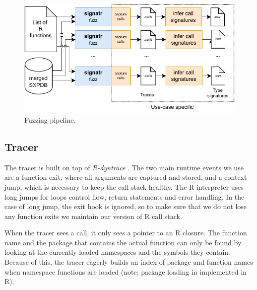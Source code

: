 \documentclass[sigplan,anonymous,review]{acmart}
\begin{document}
\begin{figure}
    \centering
    \includegraphics[width=\columnwidth]{code-and-figures/fuzz-pipeline.pdf}
    \caption{
    Fuzzing pipeline.
    }\label{fig:fuzz-pipeline}
\end{figure}

\subsection{Tracer}\label{sec:argtracer}

The tracer is built on top of \emph{R-dyntrace} .
The two main runtime events we use are a function exit, where all arguments are captured and stored, and a context jump, which is necessary to keep the call stack healthy.
The R interpreter uses long jumps for loops control flow, return statements and error handling.
In the case of long jump, the exit hook is ignored, so to make sure that we do not lose any function exits we maintain our version of R call stack.

When the tracer sees a call, it only sees a pointer to an R closure.
The function name and the package that contains the actual function can only be found by looking at the currently loaded namespaces and the symbols they contain.
Because of this, the tracer eagerly builds an index of package and function names when namespace functions are loaded (note: package loading in implemented in R).
\end{document}
